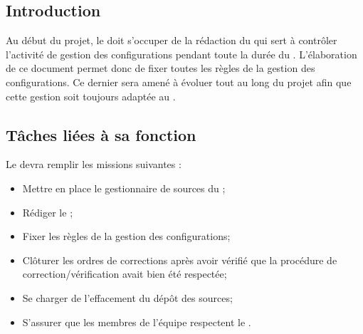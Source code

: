 
\subsection*{Introduction}

Au début du projet, le \RGC{} doit s'occuper de la rédaction du \PGCCourt{} qui sert à contrôler l’activité de gestion des configurations pendant toute la durée du \PICCourt. L’élaboration de ce document permet donc de fixer toutes les règles de la gestion des configurations. Ce dernier sera amené à évoluer tout au long du projet afin que cette gestion soit toujours adaptée au \PICCourt.

\subsection*{Tâches liées à sa fonction}

Le \RGC{} devra remplir les missions suivantes :
\begin{itemize}
	\item Mettre en place le gestionnaire de sources du \PICCourt;
	\item Rédiger le \PGC;
	\item Fixer les règles de la gestion des configurations;
        \item Clôturer les ordres de corrections après avoir vérifié que la procédure de correction/vérification avait bien été respectée;
        \item Se charger de l'effacement du dépôt des sources;
        \item S'assurer que les membres de l'équipe \PICCourt{} respectent le \PGCCourt.
\end{itemize}
